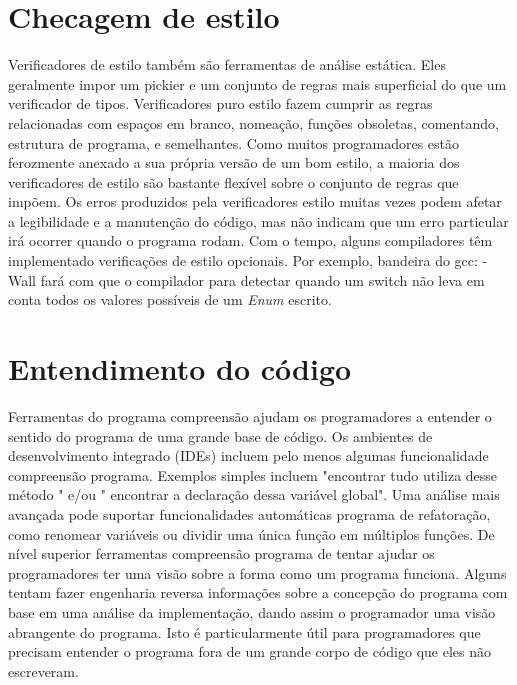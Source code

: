 	\section {Checagem de estilo}
	Verificadores de estilo também são ferramentas de análise estática. Eles geralmente impor um pickier e um conjunto de regras mais superficial do que um verificador de tipos. Verificadores puro estilo fazem cumprir as regras relacionadas com espaços em branco, nomeação, funções obsoletas, comentando, estrutura de programa, e semelhantes. Como muitos programadores estão ferozmente anexado a sua própria versão de um bom estilo, a maioria dos verificadores de estilo são bastante flexível sobre o conjunto de regras que impõem. Os erros produzidos pela verificadores estilo muitas vezes podem afetar a legibilidade e a manutenção do código, mas não indicam que um erro particular irá ocorrer quando o programa rodam. Com o tempo, alguns compiladores têm implementado verificações de estilo opcionais. Por exemplo, bandeira do gcc: -Wall fará com que o compilador para detectar quando um switch não leva em conta todos os valores possíveis de um {\it Enum} escrito.
	
	\section {Entendimento do código}
	Ferramentas do programa compreensão ajudam os programadores a entender o sentido  do programa de uma grande base de código. Os ambientes de desenvolvimento integrado (IDEs) incluem pelo menos algumas funcionalidade compreensão programa. Exemplos simples incluem "encontrar tudo utiliza desse método " e/ou " encontrar a declaração dessa variável global". Uma análise mais avançada pode suportar funcionalidades automáticas programa de refatoração, como renomear variáveis ou dividir uma única função em múltiplos funções. De nível superior ferramentas compreensão programa de tentar ajudar os programadores ter uma visão sobre a forma como um programa funciona. Alguns tentam fazer engenharia reversa informações sobre a concepção do programa com base em uma análise da implementação, dando assim o programador uma visão abrangente do programa. Isto é particularmente útil para programadores que precisam entender o programa fora de um grande corpo de código que eles não escreveram.
	
